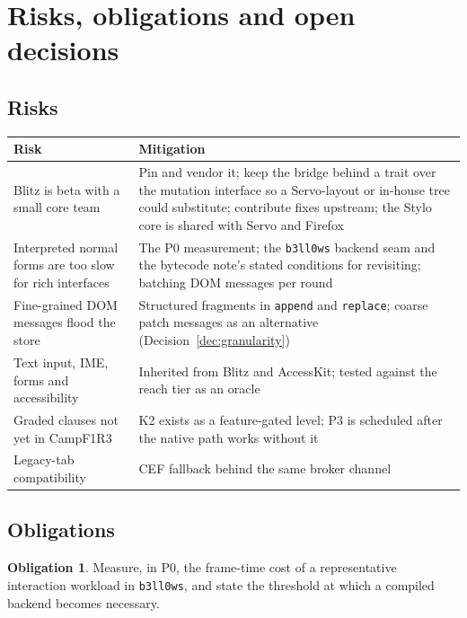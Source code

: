 \documentclass[11pt]{article}
\theoremstyle{definition}
\newtheorem{obligation}{Obligation}
\theoremstyle{remark}
\newcommand{\Camp}{CampF1R3}
\newcommand{\code}[1]{\texttt{#1}}
\begin{document}
\section{Risks, obligations and open decisions}\label{sec:risks}

\subsection{Risks}

\begin{center}
\begin{tabularx}{\linewidth}{@{}p{4.2cm}X@{}}
\toprule
Risk & Mitigation\\
\midrule
Blitz is beta with a small core team & Pin and vendor it; keep the bridge behind a trait
over the mutation interface so a Servo-layout or in-house tree could substitute; contribute
fixes upstream; the Stylo core is shared with Servo and Firefox\\
Interpreted normal forms are too slow for rich interfaces & The P0 measurement; the
\code{b3ll0ws} backend seam and the bytecode note's stated conditions for revisiting;
batching DOM messages per round\\
Fine-grained DOM messages flood the store & Structured fragments in \code{append} and
\code{replace}; coarse patch messages as an alternative (Decision~\ref{dec:granularity})\\
Text input, IME, forms and accessibility & Inherited from Blitz and AccessKit; tested
against the reach tier as an oracle\\
Graded clauses not yet in \Camp{} & K2 exists as a feature-gated level; P3 is scheduled
after the native path works without it\\
Legacy-tab compatibility & CEF fallback behind the same broker channel\\
\bottomrule
\end{tabularx}
\end{center}

\subsection{Obligations}

\begin{obligation}\label{ob:perf}
Measure, in P0, the frame-time cost of a representative interaction workload in
\code{b3ll0ws}, and state the threshold at which a compiled backend becomes necessary.
\end{obligation}
\end{document}
